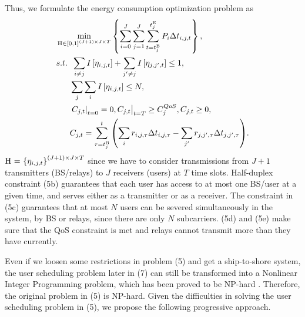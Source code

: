 \documentclass[conference]{IEEEtran}
\begin{document}
Thus, we formulate the energy consumption optimization problem as
\begin{subequations}
\begin{align}
& \mathop {\min }\limits_{{\mathbf{{\rm H}}} \in {{\left[ {0,1} \right]}^{\left( {J + 1} \right) \times J \times T}}} \left\{ {\sum\limits_{i = 0}^J {\sum\limits_{j = 1}^J {\sum\limits_{t = t_j^{{\rm{B}}}}^{t_j^{{\rm{E}}}} {{P_{i}}\Delta t_{i,j,t} } } } } \right\} ,\\
& {s.t.} \;\; \sum\limits_{i \ne j} {I\left[ {{\eta _{i,j,t}}} \right] }  + \sum\limits_{j' \ne j} { I\left[ {{\eta _{j,j',t}}} \right]  \le {1}} ,\\
& \;\;\;\;\;\; \sum\limits_j {\sum\limits_i { I\left[ {{\eta _{i,j,t}}} \right] } }  \le N ,\\
& \;\;\;\;\;\; {\left. {{{\left. {{C_{j,t}}} \right|}_{t = 0}} = 0, {C_{j,t}}} \right|_{t = T}} \ge C_j^{QoS}, {C_{j,t}} \ge 0, \\
& \;\;\;\;\;\; {C_{j,t}} = \sum\limits_{\tau  = t_j^{{\rm{B}}}}^t {\left( {\sum\limits_i {{r_{i,j,\tau }\Delta t_{i,j,\tau} }}  - \sum\limits_{j'} {{r_{j,j',\tau }\Delta t_{j,j',\tau} }} } \right)} .
\end{align}
\end{subequations}
${\mathbf{{\rm H}}}{\text{ = }}{\left\{ {{\eta _{i,j,t}}} \right\}^{\left( {J + 1} \right) \times J \times T}}$ since we have to consider transmissions from ${J + 1}$ transmitters (BS/relays) to $J$ receivers (users) at $T$ time slots. 
Half-duplex constraint (5b) guarantees that each user has access to at most one BS/user at a given time, and serves either as a transmitter or as a receiver. The constraint in (5c) guarantees that at most $N$ users can be severed simultaneously in the system, by BS or relays, since there are only $N$ subcarriers. (5d) and (5e) make sure that the QoS constraint is met and relays cannot transmit more than they have currently.

Even if we loosen some restrictions in problem (5) and get a ship-to-shore system, the user scheduling problem later in (7) can still be transformed into a Nonlinear Integer Programming problem, which has been proved to be NP-hard \cite{p420}. Therefore, the original problem in (5) is NP-hard. Given the difficulties in solving the user scheduling problem in (5), we propose the following progressive approach. 
\end{document}
